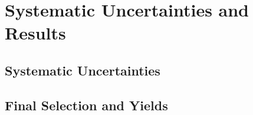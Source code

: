 \chapter{Systematic Uncertainties and Results}

\label{ch:results}

\section{Systematic Uncertainties}


\section{Final Selection and Yields}

